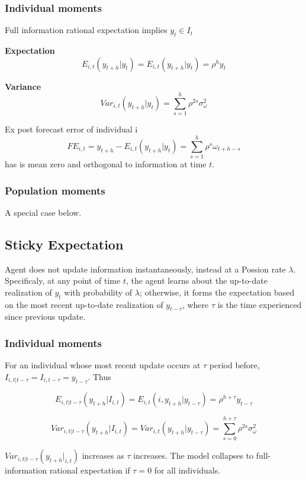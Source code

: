 \documentclass[]{article}
\begin{document}
\subsubsection{Individual moments}

Full information rational expectation implies $y_t \in I_t$

\textbf{Expectation}
$$E_{i,t}(y_{t+h}|y_t) = E_{i,t}(y_{t+h}|y_t) = \rho^h y_t $$

\textbf{Variance} 
$$Var_{i,t}(y_{t+h}|y_t) = \sum^{h}_{s=1}\rho^{2s} \sigma^2_{\omega}$$

Ex post forecast error of individual i $$FE_{i,t} = y_{t+h} - E_{i,t}(y_{t+h}|y_t) = \sum^h_{s=1} \rho^s \omega_{t+h-s}$$ has is mean zero and orthogonal to information at time $t$. 

\subsubsection{Population moments} 

A special case below.

\subsection{Sticky Expectation}

Agent does not update information instantaneously, instead at a Possion rate $\lambda$. Specificaly, at any point of time $t$, the agent learns about the up-to-date realization of $y_t$ with probability of $\lambda$; otherwise, it forms the expectation based on the most recent up-to-date realization of $y_{t-\tau}$, where $\tau$ is the time experienced since previous update. 

\subsubsection{Individual moments} 

For an individual whose most recent update occurs at $\tau$ period before, $I_{i,t|t-\tau} = I_{i,t-\tau} = y_{t-\tau}$. Thus

$$E_{i,t|t-\tau}(y_{t+h}|I_{i,t}) = E_{i,t}(i,y_{t+h}|y_{t-\tau}) = \rho^{h+\tau} y_{t-\tau}$$

$$Var_{i,t|t-\tau}(y_{t+h}|I_{i,t}) = Var_{i,t}(y_{t+h}|y_{t-\tau}) = \sum^{h+\tau}_{s=0}\rho^{2s} \sigma^2_{\omega}$$

$Var_{i,t|t-\tau}(y_{t+h}|_{i,t})$ increases as $\tau$ increases. The model collapses to full-information rational expectation if $\tau=0$ for all individuals. 
\end{document}
